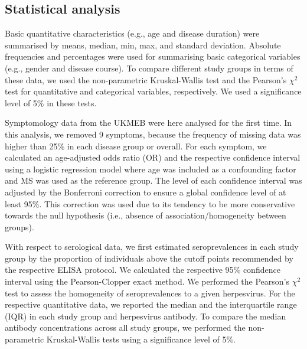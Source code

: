 \subsection{Statistical analysis}

Basic quantitative characteristics (e.g., age and disease duration) were summarised by means, median, min, max, and standard deviation. Absolute frequencies and percentages were used for summarising basic categorical variables (e.g., gender and disease course). To compare different study groups in terms of these data, we used the non-parametric Kruskal-Wallis test and the Pearson's $\chi^2$ test for quantitative and categorical variables, respectively. We used a significance level of 5\% in these tests.

Symptomology data from the UKMEB were here analysed for the first time. In this analysis, we removed 9 symptoms, because the frequency of missing data was higher than 25\% in each disease group or overall. For each symptom, we calculated an age-adjusted odds ratio (OR) and the respective confidence interval using a logistic regression model where age was included as a confounding factor and MS was used as the reference group. The level of each confidence interval was adjusted by the Bonferroni correction to ensure a global confidence level of at least 95\%. This correction was used due to its tendency to be more conservative towards the null hypothesis (i.e., absence of association/homogeneity between groups).

With respect to serological data, we first estimated seroprevalences in each study group by the proportion of individuals above the cutoff points recommended by the respective ELISA protocol. We calculated the respective 95\% confidence interval using the Pearson-Clopper exact method. We performed the Pearson's $\chi^2$ test to assess the homogeneity of seroprevalences to a given herpesvirus. For the respective quantitative data, we reported the median and the interquartile range (IQR) in each study group and herpesvirus antibody. To compare the median antibody concentrations across all study groups, we performed the non-parametric Kruskal-Wallis tests using a significance level of 5\%.

